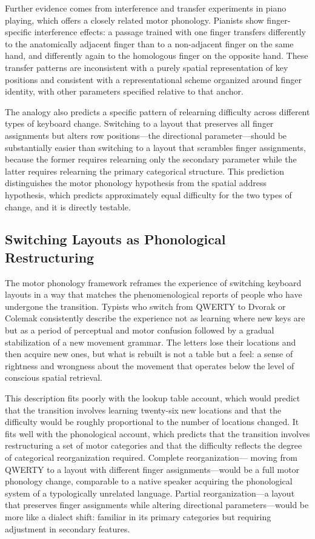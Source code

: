 \documentclass[12pt,a4paper]{article}
\theoremstyle{plain}
\theoremstyle{definition}
\theoremstyle{remark}
\begin{document}
Further evidence comes from interference and transfer experiments in piano
playing, which offers a closely related motor phonology. Pianists show
finger-specific interference effects: a passage trained with one finger
transfers differently to the anatomically adjacent finger than to a non-adjacent
finger on the same hand, and differently again to the homologous finger on the
opposite hand. These transfer patterns are inconsistent with a purely spatial
representation of key positions and consistent with a representational scheme
organized around finger identity, with other parameters specified relative to
that anchor.

The analogy also predicts a specific pattern of relearning difficulty across
different types of keyboard change. Switching to a layout that preserves all
finger assignments but alters row positions---the directional parameter---should
be substantially easier than switching to a layout that scrambles finger
assignments, because the former requires relearning only the secondary parameter
while the latter requires relearning the primary categorical structure. This
prediction distinguishes the motor phonology hypothesis from the spatial address
hypothesis, which predicts approximately equal difficulty for the two types of
change, and it is directly testable.

\subsection{Switching Layouts as Phonological Restructuring}

The motor phonology framework reframes the experience of switching keyboard
layouts in a way that matches the phenomenological reports of people who have
undergone the transition. Typists who switch from QWERTY to Dvorak or Colemak
consistently describe the experience not as learning where new keys are but as
a period of perceptual and motor confusion followed by a gradual stabilization
of a new movement grammar. The letters lose their locations and then acquire
new ones, but what is rebuilt is not a table but a feel: a sense of rightness
and wrongness about the movement that operates below the level of conscious
spatial retrieval.

This description fits poorly with the lookup table account, which would predict
that the transition involves learning twenty-six new locations and that the
difficulty would be roughly proportional to the number of locations changed.
It fits well with the phonological account, which predicts that the transition
involves restructuring a set of motor categories and that the difficulty reflects
the degree of categorical reorganization required. Complete reorganization---
moving from QWERTY to a layout with different finger assignments---would be a
full motor phonology change, comparable to a native speaker acquiring the
phonological system of a typologically unrelated language. Partial
reorganization---a layout that preserves finger assignments while altering
directional parameters---would be more like a dialect shift: familiar in its
primary categories but requiring adjustment in secondary features.
\end{document}
